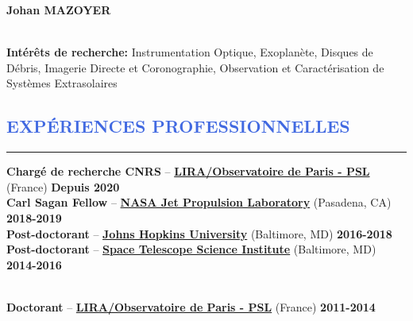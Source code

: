 \documentclass[11pt, a4paper, french]{article}
\begin{document}
\lfoot{\textcolor{Gray}{CV mis à jour en \yeardate\today}}

\begin{huge}
\noindent\textbf{Johan MAZOYER}
\end{huge}\\

\textbf{Intérêts de recherche:} Instrumentation Optique, Exoplanète, Disques de Débris, Imagerie Directe et Coronographie,
Observation et Caractérisation de Systèmes Extrasolaires\\





\vspace{-1.1cm}
\textcolor{RoyalBlue}{\section{\large EXPÉRIENCES PROFESSIONNELLES}
\vspace{-0.2cm}\hrule}
\vspace{0.4cm}


\textbf{Chargé de recherche CNRS} --
\href{https://LIRA.obspm.fr/}{\textbf{LIRA/Observatoire de Paris - PSL}} (France)
\hfill     	 { \bf Depuis 2020}\\

\vspace{-0.2cm}
\textbf{Carl Sagan Fellow} --
\href{https://www.jpl.nasa.gov/}{\textbf{NASA Jet Propulsion Laboratory}} (Pasadena, CA)
\hfill      { \bf 2018-2019}\\

\vspace{-0.2cm}
\textbf{Post-doctorant} --
\href{http://physics-astronomy.jhu.edu/}{\textbf{Johns Hopkins University}} (Baltimore, MD)
\hfill   	 { \bf 2016-2018}\\

\vspace{-0.2cm}
\textbf{Post-doctorant} --
\href{http://www.stsci.edu}{\textbf{Space Telescope Science Institute}} (Baltimore, MD)
\hfill        { \bf 2014-2016}\\\

\vspace{-0.2cm}
\textbf{Doctorant} --
\href{https://LIRA.obspm.fr/}{\textbf{LIRA/Observatoire de Paris - PSL}} (France)
\hfill        { \bf 2011-2014}\\
\end{document}
